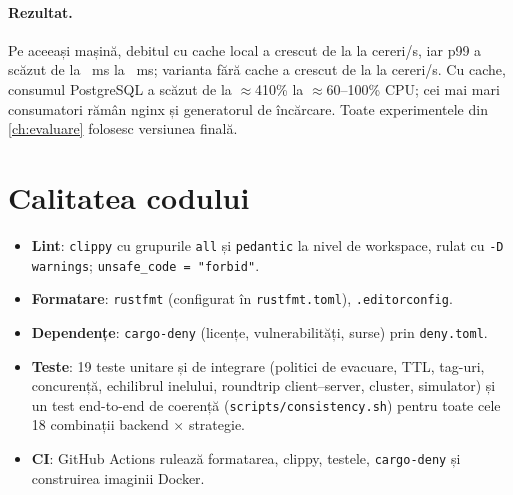 \paragraph{Rezultat.} Pe aceeași mașină, debitul cu cache local a crescut de la
 la  cereri/s, iar p99 a scăzut de la ~ms la
~ms; varianta fără cache a crescut de la  la
 cereri/s. Cu cache, consumul PostgreSQL a scăzut de la $\approx$410\% la
$\approx$60–100\% CPU; cei mai mari consumatori rămân nginx și generatorul de încărcare. Toate experimentele
din \cref{ch:evaluare} folosesc versiunea finală.

\section{Calitatea codului}

\begin{itemize}
  \item \textbf{Lint}: \texttt{clippy} cu grupurile \texttt{all} și \texttt{pedantic} la nivel de workspace,
        rulat cu \texttt{-D warnings}; \texttt{unsafe\_code = "forbid"}.
  \item \textbf{Formatare}: \texttt{rustfmt} (configurat în \texttt{rustfmt.toml}), \texttt{.editorconfig}.
  \item \textbf{Dependențe}: \texttt{cargo-deny} (licențe, vulnerabilități, surse) prin \texttt{deny.toml}.
  \item \textbf{Teste}: 19 teste unitare și de integrare (politici de evacuare, TTL, tag-uri,
        concurență, echilibrul inelului, roundtrip client–server, cluster, simulator) și un test end-to-end
        de coerență (\texttt{scripts/consistency.sh}) pentru toate cele 18 combinații backend × strategie.
  \item \textbf{CI}: GitHub Actions rulează formatarea, clippy, testele, \texttt{cargo-deny} și
        construirea imaginii Docker.
\end{itemize}

